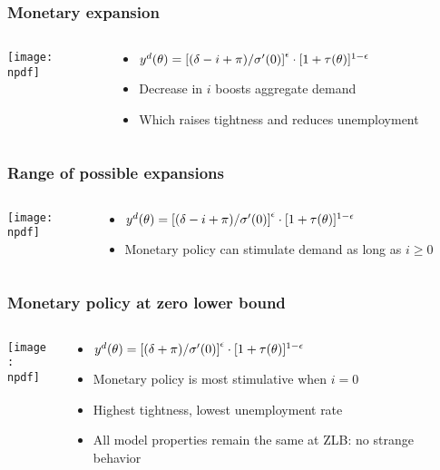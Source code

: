 \documentclass[11pt,aspectratio=169,xcolor={dvipsnames},hyperref={pdftex,pdfpagemode=UseNone,hidelinks,pdfdisplaydoctitle=true},usepdftitle=false]{beamer}
\newcommand{\npdf}{../figures/figures3.pdf}
\begin{document}
\begin{frame}
\frametitle{Monetary expansion}
\begin{columns}
\begin{column}{0.6\textwidth}
\texttt{[image: \\npdf]}%
\end{column}
\begin{column}{0.4\textwidth}
\begin{itemize}
	\item $y^d(\theta)=\left[ (\delta - i +\pi)/\sigma'(0) \right]^{\epsilon} \cdot [1+\tau(\theta)]^{1-\epsilon}$
	\item Decrease in $i$ boosts aggregate demand
	\item Which raises tightness and reduces unemployment
\end{itemize}
\end{column}
\end{columns} 
\end{frame}

\begin{frame}
\frametitle{Range of possible expansions}
\begin{columns}
\begin{column}{0.6\textwidth}
\texttt{[image: \\npdf]}%
\end{column}
\begin{column}{0.4\textwidth}
\begin{itemize}
	\item $y^d(\theta)=\left[ (\delta - i +\pi)/\sigma'(0) \right]^{\epsilon} \cdot [1+\tau(\theta)]^{1-\epsilon}$
	\item Monetary policy can stimulate demand as long as $i\geq 0$
\end{itemize}
\end{column}
\end{columns} 
\end{frame}

\begin{frame}
\frametitle{Monetary policy at zero lower bound}
\begin{columns}
\begin{column}{0.6\textwidth}
\texttt{[image: \\npdf]}%
\end{column}
\begin{column}{0.4\textwidth}
\begin{itemize}
	\item $y^d(\theta)=\left[ (\delta +\pi)/\sigma'(0) \right]^{\epsilon} \cdot [1+\tau(\theta)]^{1-\epsilon}$
	\item Monetary policy is most stimulative when $i = 0$
	\item Highest tightness, lowest unemployment rate
	\item All model properties remain the same at ZLB: no strange behavior
\end{itemize}
\end{column}
\end{columns} 
\end{frame}
\end{document}
